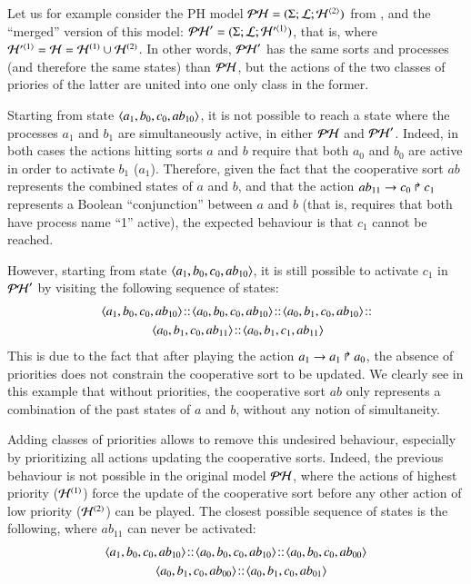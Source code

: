 Let us for example consider the PH model 
$\mathcal{PH} = (\Sigma; \mathcal{L}; \mathcal{H}^{{\langle 2 \rangle}})$ from ,
and the “merged” version of this model:
$\mathcal{PH}' = (\Sigma; \mathcal{L}; \mathcal{H}'^{{\langle 1 \rangle}})$,
that is, where $\mathcal{H}'^{{\langle 1 \rangle}} = \mathcal{H} = \mathcal{H}^{(1)} \cup \mathcal{H}^{(2)}$.
In other words, $\mathcal{PH}'$ has the same sorts and processes
(and therefore the same states) than $\mathcal{PH}$,
but the actions of the two classes of priories of the latter
are united into one only class in the former.

Starting from state $\mbox{$\langle a_1, b_0, c_0, ab_{10} \rangle$}$,
it is not possible to reach a state where the processes $a_1$ and $b_1$
are simultaneously active, in either $\mathcal{PH}$ and $\mathcal{PH}'$.
Indeed, in both cases the actions hitting sorts $a$ and $b$ require that both
$a_0$ and $b_0$ are active in order to activate $b_1$ (\resp $a_1$).
Therefore, given the fact that the cooperative sort $ab$ represents
the combined states of $a$ and $b$,
and that the action $ab_{11}\rightarrow c_0\Rsh c_1$
represents a Boolean “conjunction” between $a$ and $b$
(that is, requires that both have process name “1” active),
the expected behaviour is that $c_1$ cannot be reached.

However, starting from state $\mbox{$\langle a_1, b_0, c_0, ab_{10} \rangle$}$,
it is still possible to activate $c_1$ in $\mathcal{PH}'$
by visiting the following sequence of states:
\begin{align*}
  & \PHstate{a_1, b_0, c_0, ab_{10}} \concat
    \PHstate{a_0, b_0, c_0, ab_{10}} \concat
    \PHstate{a_0, b_1, c_0, ab_{10}} \concat \\
  & \qquad\qquad
    \PHstate{a_0, b_1, c_0, ab_{11}} \concat
    \PHstate{a_0, b_1, c_1, ab_{11}}
\end{align*}
This is due to the fact that after playing the action
$a_1\rightarrow a_1\Rsh a_0$,
the absence of priorities does not constrain the cooperative sort to be updated.
We clearly see in this example that without priorities,
the cooperative sort $ab$ only represents a combination of the past
states of $a$ and $b$, without any notion of simultaneity.

Adding classes of priorities allows to remove this undesired behaviour,
especially by prioritizing all actions updating the cooperative sorts.
Indeed, the previous behaviour is not possible in the original model $\mathcal{PH}$,
where the actions of highest priority ($\mathcal{H}^{(1)}$)
force the update of the cooperative sort before any other action of
low priority ($\mathcal{H}^{(2)}$) can be played.
The closest possible sequence of states is the following,
where $ab_{11}$ can never be activated:
\begin{align*}
  & \mbox{$\langle a_1, b_0, c_0, ab_{10} \rangle$} \!::\!
    \mbox{$\langle a_0, b_0, c_0, ab_{10} \rangle$} \!::\!
    \mbox{$\langle a_0, b_0, c_0, ab_{00} \rangle$} \\
  & \qquad\qquad
    \mbox{$\langle a_0, b_1, c_0, ab_{00} \rangle$} \!::\!
    \mbox{$\langle a_0, b_1, c_0, ab_{01} \rangle$}
\end{align*}

